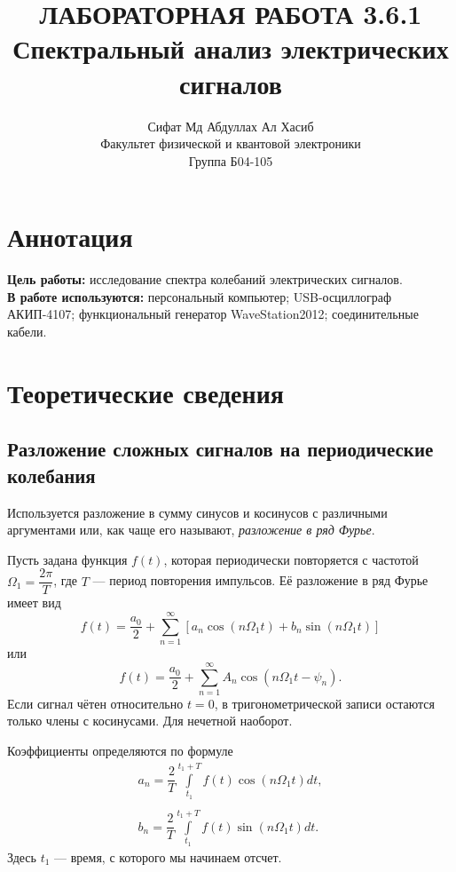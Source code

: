 \documentclass[a4paper,12pt]{article} %
\author{Сифат Мд Абдуллах Ал Хасиб\\
Факультет физической и квантовой электроники \\
Группа Б04-105}
\title{\textbf{ЛАБОРАТОРНАЯ РАБОТА 3.6.1 \\Спектральный анализ электрических сигналов}}
\begin{document}
\maketitle
\section{Аннотация}
\textbf{Цель работы:} исследование спектра колебаний электрических сигналов.\\
\textbf{В работе используются:} персональный  компьютер; USB-осциллограф  АКИП-4107; функциональный генератор WaveStation2012; соединительные кабели.
\section{Теоретические сведения}
\subsection{Разложение сложных сигналов на периодические колебания}
Используется разложение в сумму синусов и косинусов с различными аргументами или, как чаще его называют, \textit{разложение в ряд Фурье}.

Пусть задана функция $f(t)$, которая периодически повторяется с частотой $\Omega_1 = \dfrac{2\pi}{T}$, где $T$ --- период повторения импульсов. Её разложение в ряд Фурье имеет вид 
\begin{equation}
f(t) = \dfrac{a_0}{2} + \sum\limits_{n = 1}^{\infty}\left[a_n \cos \left(n \Omega_1t\right) + b_n \sin \left(n \Omega_1t\right)\right]
\end{equation}
или
\begin{equation}
f(t) = \dfrac{a_0}{2} + \sum\limits_{n = 1}^{\infty}A_n \cos \left(n\Omega_1t-\psi_n\right).
\end{equation}
Если сигнал чётен относительно $t=0$, в тригонометрической записи остаются только члены с косинусами. Для нечетной наоборот.

Коэффициенты определяются по формуле
\begin{equation}
\begin{array}{c}
a_n  = \dfrac{2}{T}\int\limits_{t_1}^{t_1+T}f(t)\cos\left(n \Omega_1 t\right) dt,\\
\\
b_n = \dfrac{2}{T}\int\limits_{t_1}^{t_1+T}f(t)\sin\left(n \Omega_1 t\right) dt.
\end{array}
\end{equation}
Здесь $t_1$ --- время, с которого мы начинаем отсчет.
\end{document}

